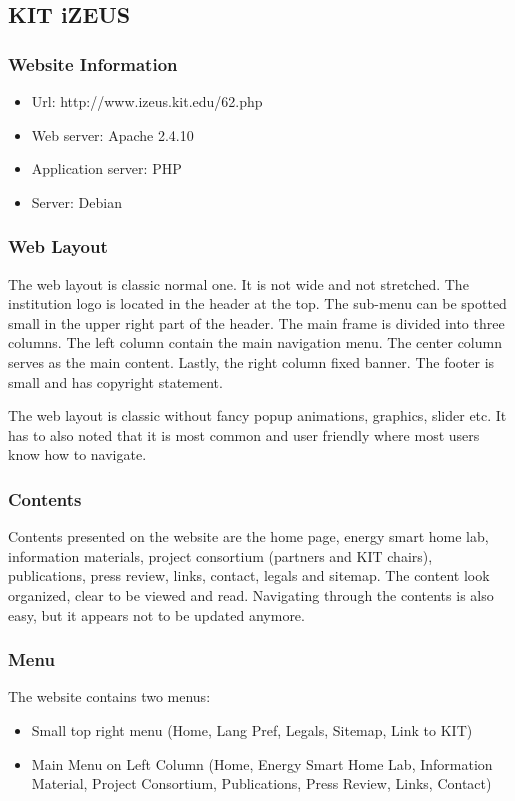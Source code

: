 \subsection{KIT iZEUS}
\subsubsection*{Website Information}
\begin{itemize}
\item Url: http://www.izeus.kit.edu/62.php
\item Web server: Apache 2.4.10
\item Application server: PHP
\item Server: Debian
\end{itemize}

\subsubsection*{Web Layout}
The web layout is classic normal one. It is not wide and not stretched. The institution logo is located in the header at the top. The sub-menu can be spotted small in the upper right part of the header. The main frame is divided into three columns. The left column contain the main navigation menu. The center column serves as the main content. Lastly, the right column fixed banner. The footer is small and has copyright statement.

The web layout is classic without fancy popup animations, graphics, slider etc. It has to also noted that it is most common and user friendly where most users know how to navigate.

\subsubsection*{Contents}
Contents presented on the website are the home page, energy smart home lab, information materials, project consortium (partners and KIT chairs), publications, press review, links, contact, legals and sitemap. The content look organized, clear to be viewed and read. Navigating through the contents is also easy, but it appears not to be updated anymore.

\subsubsection*{Menu}
The website contains two menus:
\begin{itemize}
\item Small top right menu (Home, Lang Pref, Legals, Sitemap, Link to KIT)
\item Main Menu on Left Column (Home, Energy Smart Home Lab, Information Material, Project Consortium, Publications, Press Review, Links, Contact)
\end{itemize}

